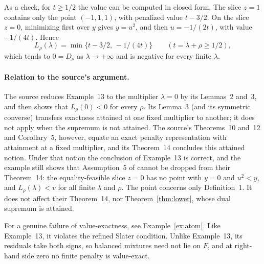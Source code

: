 As a check, for $t\ge1/2$ the value can be computed in closed form. The
slice $z=1$ contains only the point $(-1,1,1)$, with penalized value
$t-3/2$. On the slice $z=0$, minimizing first over $y$ gives $y=u^2$,
and then $u=-1/(2t)$, with value $-1/(4t)$. Hence
\[
 L_\rho(\lambda)=\min\{t-3/2,\,-1/(4t)\}\qquad(t=\lambda+\rho\ge1/2),
\]
which tends to $0=D_\rho$ as $\lambda\to+\infty$ and is negative for
every finite $\lambda$.

\paragraph{Relation to the source's argument.}
The source reduces Example~13 to the multiplier $\lambda=0$ by its
Lemmas~2 and~3, and then shows that $L_\rho(0)<0$ for every $\rho$. Its
Lemma~3 (and its symmetric converse) transfers exactness attained at one
fixed multiplier to another; it does not apply when the supremum is not
attained. The source's Theorems~10 and~12 and Corollary~5, however,
equate an exact penalty representation with attainment at a fixed
multiplier, and its Theorem~14 concludes this attained notion. Under that
notion the conclusion of Example~13 is correct, and the example still
shows that Assumption~5 of \citet{LefebvreSchmidt2025} cannot be dropped
from their Theorem~14: the equality-feasible slice $z=0$ has no point
with $y=0$ and $u^2<y$, and $L_\rho(\lambda)<v$ for all finite $\lambda$
and $\rho$. The point concerns only Definition~1. It does not affect
their Theorem~14, nor Theorem~\ref{thm:lower}, whose dual supremum is
attained.

For a genuine failure of value-exactness, see
Example~\ref{ex:atom}. Like Example~13, it violates the refined Slater
condition. Unlike Example~13, its residuals take both signs, so balanced
mixtures need not lie on $F$, and at right-hand side zero no finite
penalty is value-exact.
